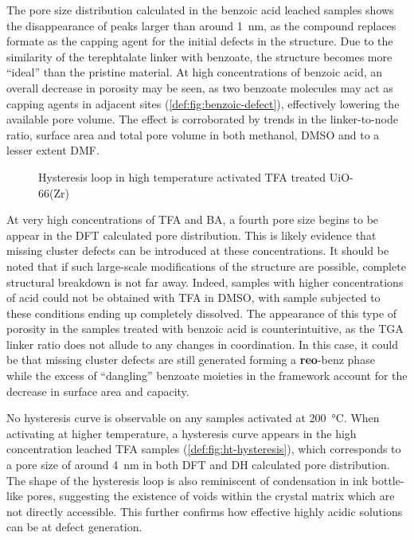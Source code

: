 The pore size distribution calculated in the benzoic acid leached
samples shows the disappearance of peaks larger than around 
\SI{1}{\nano\metre}, as the compound replaces formate as the 
capping agent for the initial defects in the structure. Due to the 
similarity of the terephtalate linker with benzoate, the structure
becomes more ``ideal'' than the pristine material. At high concentrations
of benzoic acid, an overall decrease in porosity may be seen, as 
two benzoate molecules may act as capping agents in adjacent 
sites (\autoref{def:fig:benzoic-defect}), effectively 
lowering the available pore volume. The effect is corroborated 
by trends in the linker-to-node ratio, surface area and total 
pore volume in both methanol, DMSO and to a lesser extent DMF.

\begin{wrapfigure}[13]{r}{0.3\textwidth}
    \centering
    \captionsetup{format=plain}
    \caption{Hysteresis loop in high temperature activated TFA treated 
    UiO-66(Zr)}%
    \label{def:fig:ht-hysteresis}
\end{wrapfigure}

At very high concentrations of TFA and BA, a fourth pore size
begins to be appear in the DFT calculated pore distribution.
This is likely evidence that missing cluster defects can be 
introduced at these concentrations. It should be noted that 
if such large-scale modifications of the structure are possible,
complete structural breakdown is not far away. Indeed, samples with 
higher concentrations of acid could not be obtained with TFA in DMSO,
with sample subjected to these conditions ending up completely
dissolved. The appearance of this type of porosity in the samples
treated with benzoic acid is counterintuitive, as the TGA linker
ratio does not allude to any changes in coordination. In this case,
it could be that missing cluster defects are still generated
forming a \textbf{reo}-benz phase~\cite{atzoriEffectBenzoicAcid2017} 
while the excess of ``dangling'' benzoate moieties in the framework 
account for the decrease in surface area and capacity.

No hysteresis curve is observable on any samples activated at 
\SI{200}{\degreeCelsius}. When activating at higher temperature,
a hysteresis curve appears in the high concentration leached
TFA samples (\autoref{def:fig:ht-hysteresis}), which corresponds to
a pore size of around \SI{4}{\nano\metre} in both DFT and DH calculated
pore distribution. The shape of the hysteresis loop is also 
reminiscent of condensation in ink bottle-like pores, suggesting
the existence of voids within the crystal matrix which are 
not directly accessible. This further confirms how effective 
highly acidic solutions can be at defect generation.